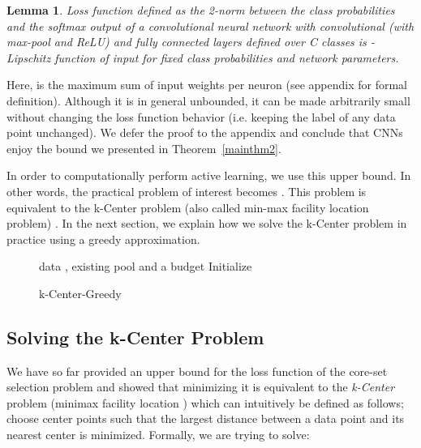 \documentclass{article} \usepackage{iclr2018_conference,times}
\makeatletter
\newtheorem{lemma}{Lemma}
\newcommand*{\ie}{i.e.\@\xspace}
\makeatother
\begin{document}
\begin{lemma} 
Loss function defined as the 2-norm between the class
probabilities and the softmax output of a convolutional neural network with  convolutional (with max-pool and ReLU) and  fully connected layers defined over C classes is -Lipschitz function of input for fixed class probabilities and network parameters. \end{lemma}

Here,  is the maximum sum of  input weights per neuron (see appendix for formal definition). Although it is in
general unbounded, it can be made arbitrarily small without changing the loss function behavior (\ie keeping the label
of any data point  unchanged). We defer the proof to the appendix and conclude that CNNs enjoy the bound we
presented in Theorem~\ref{mainthm2}.

In order to computationally perform active learning, we use this upper bound. In other words, the practical problem of interest becomes . This problem is equivalent to the k-Center problem (also called min-max facility location problem) \citep{facility}. In the next section, we explain how we solve the k-Center problem in practice using a greedy approximation.{\par}

\begin{wrapfigure}{R}{0pt}
\begin{minipage}{0.44\textwidth}
\vspace{-8mm}
   \begin{algorithm}[H] 
   \caption{k-Center-Greedy} 
   \label{alg:greedy} 
   \begin{algorithmic} 
    data , existing pool  and a budget  
   \STATE Initialize  \REPEAT \STATE  \STATE  
   \UNTIL {} 
     \end{algorithmic}
\end{algorithm} 
\vspace{-10mm}
\end{minipage} 
\end{wrapfigure}  

\subsection{Solving the k-Center Problem} 
\label{sec:alg} 
We have so far provided an upper bound for the loss function of the core-set selection problem and showed that minimizing it is equivalent to the \emph{k-Center} problem (minimax facility location \citep{facility}) which can intuitively be defined as follows; choose  center points such that the  largest distance between a data point and its nearest center is minimized. Formally, we are trying to solve: 
\end{document}
